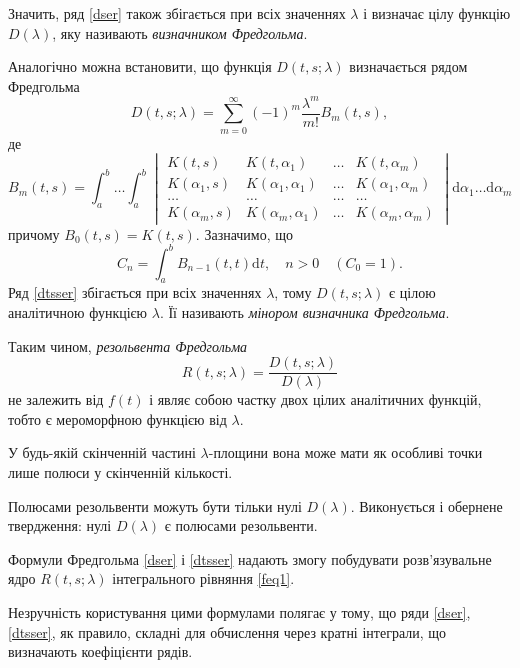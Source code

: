 \documentclass[14pt,twoside]{extreport}
\theoremstyle{mystyle}
\numberwithin{equation}{chapter}
\begin{document}
Значить, ряд \eqref{dser} також збігається при всіх значеннях $\lambda$ і визначає цілу функцію $D(\lambda)$, яку називають \emph{визначником Фредгольма}.

Аналогічно можна встановити, що функція $D(t, s; \lambda)$ визначається рядом Фредгольма
\begin{equation}\label{dtsser}
 D(t, s; \lambda)=\sum^{\infty}_{m=0}(-1)^{m}\frac{\lambda^{m}}{m!}B_{m}(t, s),
\end{equation}
де
\begin{equation}\label{b_m}
B_m(t, s) = \int_{a}^{b}\ldots \int_{a}^{b}
\begin{vmatrix}
K(t, s) & K(t, \alpha_1) & \ldots & K(t, \alpha_m)\\
K(\alpha_1, s) & K(\alpha_1, \alpha_1) & \ldots & K(\alpha_1, \alpha_m)\\
\ldots & \ldots & \ldots & \ldots\\
K(\alpha_m, s) & K(\alpha_m, \alpha_1) & \ldots & K(\alpha_m, \alpha_m)
\end{vmatrix}\mathrm{d}\alpha_1\ldots\mathrm{d}\alpha_m
\end{equation}
причому $B_0 (t, s) = K(t, s)$. Зазначимо, що
\[
 C_n=\int_{a}^{b}B_{n-1}(t, t) \mathrm{d}t, \quad n>0\quad (C_0=1).
\]
Ряд \eqref{dtsser} збігається при всіх значеннях $\lambda$, тому $D(t, s; \lambda)$ є цілою аналітичною функцією $\lambda$. Її називають \emph{мінором визначника Фредгольма}.

Таким чином, \emph{резольвента Фредгольма}
\begin{equation}\label{resdeg}
 R(t,s;\lambda)=\frac{D(t,s;\lambda)}{D(\lambda)}
\end{equation}
не залежить від $f(t)$ і являє собою частку двох цілих аналітичних функцій, тобто є мероморфною функцією від $\lambda$.

У будь-якій скінченній частині $\lambda$-площини вона може мати як особливі точки лише полюси у скінченній кількості.

Полюсами резольвенти можуть бути тільки нулі $D(\lambda)$. Виконується і обернене твердження: нулі $D(\lambda)$ є полюсами резольвенти.

Формули Фредгольма \eqref{dser} і \eqref{dtsser} надають змогу побудувати розв'язувальне ядро $R(t, s; \lambda)$ інтегрального рівняння \eqref{feq1}.

Незручність користування цими формулами полягає у тому, що ряди \eqref{dser}, \eqref{dtsser}, як правило, складні для обчислення через кратні інтеграли, що визначають коефіцієнти рядів.
\end{document}
